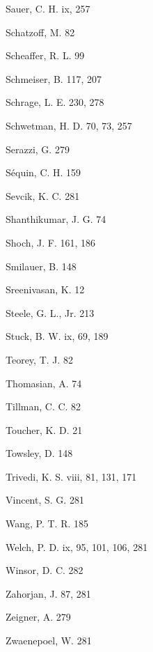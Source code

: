 \noindent Sauer, C. H. ix, 257\par
\noindent Schatzoff, M. 82\par
\noindent Scheaffer, R. L. 99\par
\noindent Schmeiser, B. 117, 207\par
\noindent Schrage, L. E. 230, 278\par
\noindent Schwetman, H. D. 70, 73, 257\par
\noindent Serazzi, G. 279\par
\noindent S\'equin, C. H. 159\par
\noindent Sevcik, K. C. 281\par
\noindent Shanthikumar, J. G. 74\par
\noindent Shoch, J. F. 161, 186\par
\noindent Smilauer, B. 148\par
\noindent Sreenivasan, K. 12\par
\noindent Steele, G. L., Jr. 213\par
\noindent Stuck, B. W. ix, 69, 189\par
\noindent Teorey, T. J. 82\par
\noindent Thomasian, A. 74\par
\noindent Tillman, C. C. 82\par
\noindent Toucher, K. D. 21\par
\noindent Towsley, D. 148\par
\noindent Trivedi, K. S. viii, 81, 131, 171\par
\noindent Vincent, S. G. 281\par
\noindent Wang, P. T. R. 185\par
\noindent Welch, P. D. ix, 95, 101, 106, 281\par
\noindent Winsor, D. C. 282\par
\noindent Zahorjan, J. 87, 281\par
\noindent Zeigner, A. 279\par
\noindent Zwaenepoel, W. 281\par

